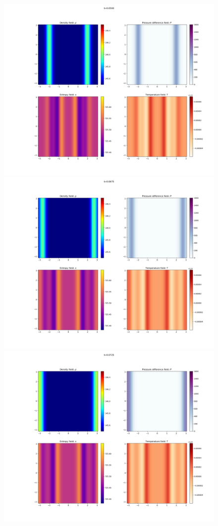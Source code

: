 \documentclass{article}
\begin{document}
\begin{figure}[h]
    \includegraphics[width=\textwidth/3]{Sim 2/SF02_0020.png}
    \includegraphics[width=\textwidth/3]{Sim 2/SF02_0027.png}
    \includegraphics[width=\textwidth/3]{Sim 2/SF02_0029.png}

\end{figure}
\end{document}
